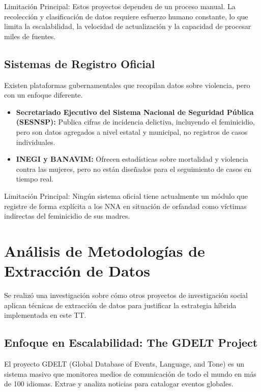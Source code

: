 Limitación Principal: Estos proyectos dependen de un proceso manual. La recolección y clasificación de datos requiere esfuerzo humano constante, lo que limita la escalabilidad, la velocidad de actualización y la capacidad de procesar miles de fuentes.

\subsection{Sistemas de Registro Oficial}
\label{subsec:sistemas_oficiales}

Existen plataformas gubernamentales que recopilan datos sobre violencia, pero con un enfoque diferente.
\begin{itemize}
    \item \textbf{Secretariado Ejecutivo del Sistema Nacional de Seguridad Pública (SESNSP):} Publica cifras de incidencia delictiva, incluyendo el feminicidio, pero son datos agregados a nivel estatal y municipal, no registros de casos individuales.
    \item \textbf{INEGI y BANAVIM:} Ofrecen estadísticas sobre mortalidad y violencia contra las mujeres, pero no están diseñados para el seguimiento de casos en tiempo real.
\end{itemize}

Limitación Principal: Ningún sistema oficial tiene actualmente un módulo que registre de forma explícita a los NNA en situación de orfandad como víctimas indirectas del feminicidio de sus madres.

\section{Análisis de Metodologías de Extracción de Datos}
\label{sec:proyectos_similares}

Se realizó una investigación sobre cómo otros proyectos de investigación social aplican técnicas de extracción de datos para justificar la estrategia híbrida implementada en este TT.

\subsection{Enfoque en Escalabilidad: The GDELT Project}
\label{subsec:gdelt}
El proyecto GDELT (Global Database of Events, Language, and Tone) es un sistema masivo que monitorea medios de comunicación de todo el mundo en más de 100 idiomas. Extrae y analiza noticias para catalogar eventos globales.

